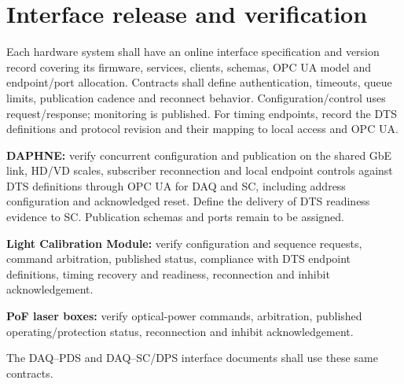 \section{Interface release and verification}

Each hardware system shall have an online interface specification and version
record covering its firmware, services, clients, schemas, OPC UA model and
endpoint/port allocation. Contracts shall define authentication, timeouts,
queue limits, publication cadence and reconnect behavior. Configuration/control
uses request/response; monitoring is published.
For timing endpoints, record the DTS definitions and protocol revision and
their mapping to local access and OPC UA.

\textbf{DAPHNE:} verify concurrent configuration and publication on the shared
GbE link, HD/VD scales, subscriber reconnection and local endpoint controls
against DTS definitions through OPC UA for DAQ and SC, including address
configuration and acknowledged reset. Define the delivery of DTS readiness
evidence to SC. Publication schemas and ports remain to be assigned.

\textbf{Light Calibration Module:} verify configuration and sequence requests,
command arbitration, published status, compliance with DTS endpoint definitions,
timing recovery and readiness,
reconnection and inhibit acknowledgement.

\textbf{PoF laser boxes:} verify optical-power commands, arbitration,
published operating/protection status, reconnection and inhibit acknowledgement.

The DAQ--PDS and DAQ--SC/DPS interface documents shall use these same contracts.
